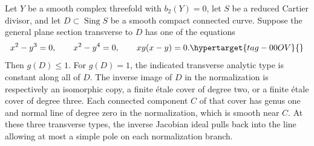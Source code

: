 \begin{proposition}\hypertarget{tag-01FJ}{}\label{cdp:st:C2d}

Let $Y$ be a smooth complex threefold with $b_2(Y)=0$, let $S$ be a reduced Cartier divisor, and let $D\subset\operatorname{Sing}S$ be a smooth compact connected curve. Suppose the general plane section transverse to $D$ has one of the equations
\begin{equation}
 x^2-y^3=0,\qquad x^2-y^4=0,\qquad xy(x-y)=0.
 \hypertarget{tag-00OV}{}\label{cdp:eq:C.J.1}
\end{equation}
Then $g(D)\le1$. For $g(D)=1$, the indicated transverse analytic type is constant along all of $D$. The inverse image of $D$ in the normalization is respectively an isomorphic copy, a finite \'etale cover of degree two, or a finite \'etale cover of degree three. Each connected component $C$ of that cover has genus one and normal line of degree zero in the normalization, which is smooth near $C$. At these three transverse types, the inverse Jacobian ideal pulls back into the line allowing at most a simple pole on each normalization branch.
\end{proposition}


